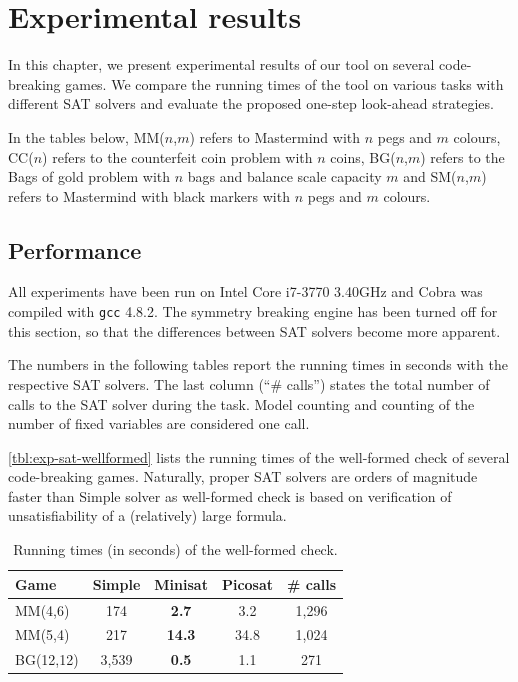 \chapter{Experimental results} \label{ch:exp}
In this chapter, we present experimental results of our tool on several code-breaking games.
We compare the running times of the tool on various tasks with different SAT solvers and
  evaluate the proposed one-step look-ahead strategies.

In the tables below, MM($n$,$m$) refers to Mastermind with $n$ pegs and $m$ colours,
CC($n$) refers to the counterfeit coin problem with $n$ coins,
BG($n$,$m$) refers to the Bags of gold problem with $n$ bags and balance scale capacity $m$ and
SM($n$,$m$) refers to Mastermind with black markers with $n$ pegs and $m$ colours.

\section{Performance}

All experiments have been run on Intel Core i7-3770 3.40GHz and Cobra was
compiled with \texttt{gcc} 4.8.2.
The symmetry breaking engine has been turned off for this section,
  so that the differences between SAT solvers become more apparent.

The numbers in the following tables report the running times in seconds with
  the respective SAT solvers.
The last column (``\# calls'') states the total number of calls to
  the SAT solver during the task.
Model counting and counting of the number of fixed variables are considered one call.

\autoref{tbl:exp-sat-wellformed} lists the running times of the well-formed check
  of several code-breaking games.
Naturally, proper SAT solvers are orders of magnitude faster than Simple solver
as well-formed check is based on verification of unsatisfiability of
  a (relatively) large formula.

\begin{table}[ht]
\begin{center}
\begin{tabular}{|l|c|c|c|c|} \hline
Game & Simple & Minisat & Picosat  & \# calls \\ \hline
MM(4,6) & 174 & \textbf{2.7} & 3.2 & 1,296 \\
MM(5,4) & 217 & \textbf{14.3} & 34.8 & 1,024 \\
BG(12,12) & 3,539 &  \textbf{0.5} & 1.1 & 271 \\\hline
\end{tabular}
\caption{Running times (in seconds) of the well-formed check.}
\label{tbl:exp-sat-wellformed}
\end{center}
\end{table}

